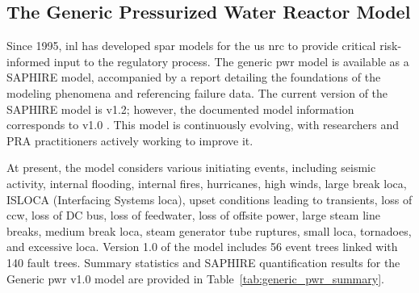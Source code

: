 \subsection{The Generic Pressurized Water Reactor Model}
\label{subsec:generic_pwr_dataset}

Since 1995, \acrshort{inl} has developed \acrfull{spar} models for the \acrshort{us} \acrshort{nrc} to provide critical risk-informed input to the regulatory process. The generic \acrshort{pwr} model is available as a SAPHIRE model, accompanied by a report detailing the foundations of the modeling phenomena and referencing failure data. The current version of the SAPHIRE model is v1.2; however, the documented model information corresponds to v1.0 \cite{aras_generic_2024}. This model is continuously evolving, with researchers and PRA practitioners actively working to improve it.

At present, the model considers various initiating events, including seismic activity, internal flooding, internal fires, hurricanes, high winds,  large break \acrfull{loca}, ISLOCA (Interfacing Systems \acrshort{loca}), upset conditions leading to transients, loss of \acrfull{ccw}, loss of DC bus, loss of feedwater, loss of offsite power, large steam line breaks, medium break \acrshort{loca}, steam generator tube ruptures, small \acrshort{loca}, tornadoes, and excessive \acrshort{loca}. Version 1.0 of the model includes 56 event trees linked with 140 fault trees. Summary statistics and SAPHIRE quantification results for the Generic \acrshort{pwr} v1.0 model are provided in Table~\ref{tab:generic_pwr_summary}.

\begin{landscape}

\end{landscape}
